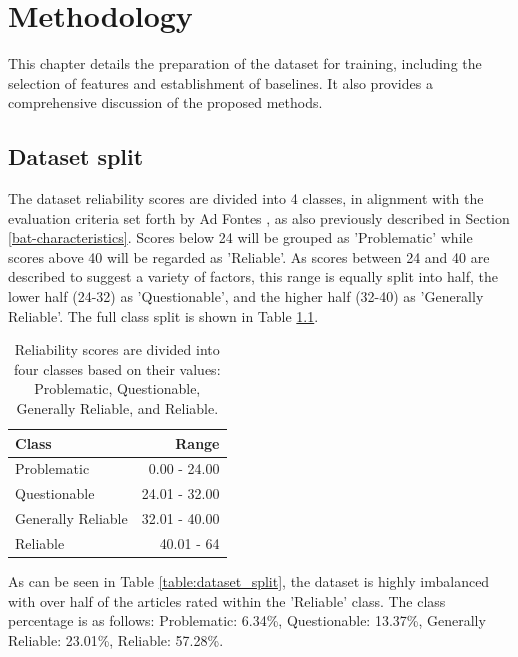 \chapter{Methodology}
\label{cha:4}

This chapter details the preparation of the dataset for training, including the selection of features and establishment of baselines. It also provides a comprehensive discussion of the proposed methods.


\section{Dataset split}

The dataset reliability scores are divided into 4 classes, in alignment with the evaluation criteria set forth by Ad Fontes \cite{adfontes-bias-reliability,otero-2021-adfontes-methodology}, as also previously described in Section \ref{bat-characteristics}. Scores below 24 will be grouped as 'Problematic' while scores above 40 will be regarded as 'Reliable'. As scores between 24 and 40 are described to suggest a variety of factors, this range is equally split into half, the lower half (24-32) as 'Questionable', and the higher half (32-40) as 'Generally Reliable'. The full class split is shown in Table \ref{table:label_split}.

\begin{table}[htbp]
    \centering
    \begin{tabular}{| l | r |}
        \hline
        Class              & Range         \\
        \hline
        Problematic        & 0.00 - 24.00  \\
        Questionable       & 24.01 - 32.00 \\
        Generally Reliable & 32.01 - 40.00 \\
        Reliable           & 40.01 - 64    \\
        \hline
    \end{tabular}
    \caption{Reliability scores are divided into four classes based on their values: Problematic, Questionable, Generally Reliable, and Reliable.}
    \label{table:label_split}
\end{table}

As can be seen in Table \ref{table:dataset_split}, the dataset is highly imbalanced with over half of the articles rated within the 'Reliable' class. The class percentage is as follows: Problematic: 6.34\%, Questionable: 13.37\%, Generally Reliable: 23.01\%, Reliable: 57.28\%.

